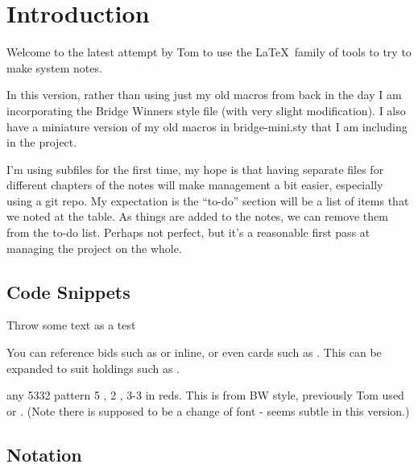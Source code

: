 \documentclass[tom-ari]{subfile}
\begin{document}
\chapter{Introduction}

Welcome to the latest attempt by Tom to use the \LaTeX~family of tools to try to make system notes.  

In this version, rather than using just my old macros from back in the day I am incorporating the Bridge Winners style file (with very slight modification).  I also have a miniature version of my old macros in bridge-mini.sty that I am including in the project.

I'm using subfiles for the first time, my hope is that having separate files for different chapters of the notes will make management a bit easier, especially using a git repo.  
My expectation is the ``to-do'' section will be a list of items that we noted at the table.  As things are added to the notes, we can remove them from the to-do list.  Perhaps not perfect, but it's a reasonable first pass at managing the project on the whole.

\section{Code Snippets}

Throw some text as a test


You can reference bids such as    or  inline, or even cards such as    . This can be expanded to suit holdings such as .

 any 5332 pattern
 5 \spadesuit, 2 \clubsuit, 3-3 in reds.  This is from BW style, previously Tom used  or .  (Note there is supposed to be a change of font - seems subtle in this version.) 


\section{Notation}
\end{document}
